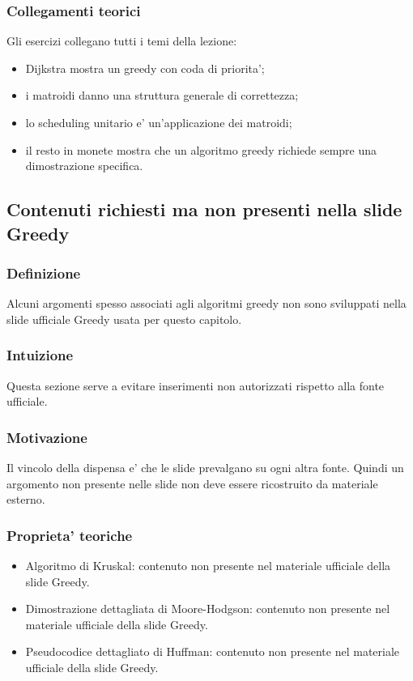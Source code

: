 \subsubsection{Collegamenti teorici}
Gli esercizi collegano tutti i temi della lezione:
\begin{itemize}
	\item Dijkstra mostra un greedy con coda di priorita';
	\item i matroidi danno una struttura generale di correttezza;
	\item lo scheduling unitario e' un'applicazione dei matroidi;
	\item il resto in monete mostra che un algoritmo greedy richiede sempre una dimostrazione specifica.
\end{itemize}

\subsection{Contenuti richiesti ma non presenti nella slide Greedy}

\subsubsection{Definizione}
Alcuni argomenti spesso associati agli algoritmi greedy non sono sviluppati nella slide ufficiale Greedy usata per questo capitolo.

\subsubsection{Intuizione}
Questa sezione serve a evitare inserimenti non autorizzati rispetto alla fonte ufficiale.

\subsubsection{Motivazione}
Il vincolo della dispensa e' che le slide prevalgano su ogni altra fonte. Quindi un argomento non presente nelle slide non deve essere ricostruito da materiale esterno.

\subsubsection{Proprieta' teoriche}
\begin{itemize}
	\item Algoritmo di Kruskal: contenuto non presente nel materiale ufficiale della slide Greedy.
	\item Dimostrazione dettagliata di Moore-Hodgson: contenuto non presente nel materiale ufficiale della slide Greedy.
	\item Pseudocodice dettagliato di Huffman: contenuto non presente nel materiale ufficiale della slide Greedy.
\end{itemize}

